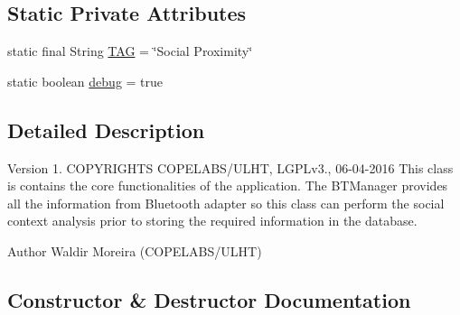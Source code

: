 \subsection*{Static Private Attributes}
\begin{DoxyCompactItemize}
\item 
static final String \hyperlink{classcom_1_1copelabs_1_1oiframework_1_1socialproximity_1_1_social_proximity_a5c66e514f85322b5edac4ed87c7db4c5}{T\+A\+G} = \char`\"{}Social Proximity\char`\"{}
\item 
static boolean \hyperlink{classcom_1_1copelabs_1_1oiframework_1_1socialproximity_1_1_social_proximity_a188af1800b775222b092cde440cd66a1}{debug} = true
\end{DoxyCompactItemize}


\subsection{Detailed Description}
\begin{DoxyVersion}{Version}
1. C\+O\+P\+Y\+R\+I\+G\+H\+T\+S C\+O\+P\+E\+L\+A\+B\+S/\+U\+L\+H\+T, L\+G\+P\+Lv3., 06-\/04-\/2016 This class is contains the core functionalities of the application. The B\+T\+Manager provides all the information from Bluetooth adapter so this class can perform the social context analysis prior to storing the required information in the database. 
\end{DoxyVersion}
\begin{DoxyAuthor}{Author}
Waldir Moreira (C\+O\+P\+E\+L\+A\+B\+S/\+U\+L\+H\+T) 
\end{DoxyAuthor}


\subsection{Constructor \& Destructor Documentation}
\hypertarget{classcom_1_1copelabs_1_1oiframework_1_1socialproximity_1_1_social_proximity_aa0abea52e79d4068926435fb82b37735}{}
